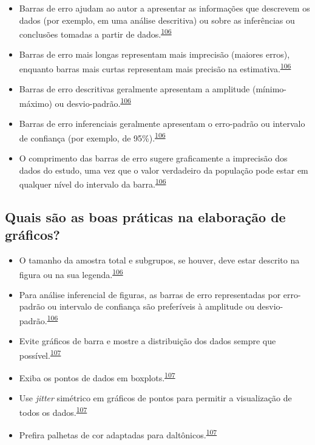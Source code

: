 \documentclass[
  a4paper,
]{book}
\begin{document}
\begin{itemize}
\item
  Barras de erro ajudam ao autor a apresentar as informações que descrevem os dados (por exemplo, em uma análise descritiva) ou sobre as inferências ou conclusões tomadas a partir de dados.\textsuperscript{\protect\hyperlink{ref-Cumming2007}{106}}
\item
  Barras de erro mais longas representam mais imprecisão (maiores erros), enquanto barras mais curtas representam mais precisão na estimativa.\textsuperscript{\protect\hyperlink{ref-Cumming2007}{106}}
\item
  Barras de erro descritivas geralmente apresentam a amplitude (mínimo-máximo) ou desvio-padrão.\textsuperscript{\protect\hyperlink{ref-Cumming2007}{106}}
\item
  Barras de erro inferenciais geralmente apresentam o erro-padrão ou intervalo de confiança (por exemplo, de 95\%).\textsuperscript{\protect\hyperlink{ref-Cumming2007}{106}}
\item
  O comprimento das barras de erro sugere graficamente a imprecisão dos dados do estudo, uma vez que o valor verdadeiro da população pode estar em qualquer nível do intervalo da barra.\textsuperscript{\protect\hyperlink{ref-Cumming2007}{106}}
\end{itemize}

\hypertarget{quais-suxe3o-as-boas-pruxe1ticas-na-elaborauxe7uxe3o-de-gruxe1ficos}{%
\subsection{Quais são as boas práticas na elaboração de gráficos?}\label{quais-suxe3o-as-boas-pruxe1ticas-na-elaborauxe7uxe3o-de-gruxe1ficos}}

\begin{itemize}
\item
  O tamanho da amostra total e subgrupos, se houver, deve estar descrito na figura ou na sua legenda.\textsuperscript{\protect\hyperlink{ref-Cumming2007}{106}}
\item
  Para análise inferencial de figuras, as barras de erro representadas por erro-padrão ou intervalo de confiança são preferíveis à amplitude ou desvio-padrão.\textsuperscript{\protect\hyperlink{ref-Cumming2007}{106}}
\item
  Evite gráficos de barra e mostre a distribuição dos dados sempre que possível.\textsuperscript{\protect\hyperlink{ref-Weissgerber2019}{107}}
\item
  Exiba os pontos de dados em boxplots.\textsuperscript{\protect\hyperlink{ref-Weissgerber2019}{107}}
\item
  Use \emph{jitter} simétrico em gráficos de pontos para permitir a visualização de todos os dados.\textsuperscript{\protect\hyperlink{ref-Weissgerber2019}{107}}
\item
  Prefira palhetas de cor adaptadas para daltônicos.\textsuperscript{\protect\hyperlink{ref-Weissgerber2019}{107}}
\end{itemize}
\end{document}
